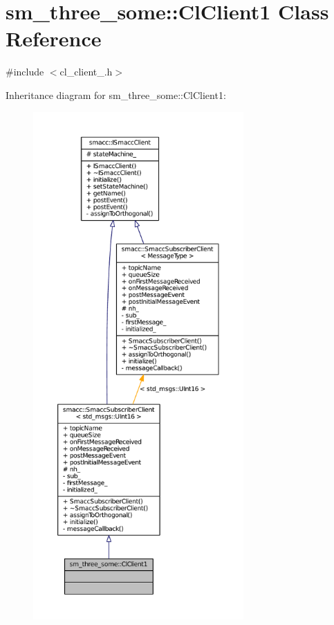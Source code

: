 \hypertarget{classsm__three__some_1_1ClClient1}{}\section{sm\+\_\+three\+\_\+some\+:\+:Cl\+Client1 Class Reference}
\label{classsm__three__some_1_1ClClient1}


{\ttfamily \#include $<$cl\+\_\+client\+\_.\+h$>$}



Inheritance diagram for sm\+\_\+three\+\_\+some\+:\+:Cl\+Client1\+:
\nopagebreak
\begin{figure}[H]
\begin{center}
\leavevmode
\includegraphics[height=550pt]{classsm__three__some_1_1ClClient1__inherit__graph}
\end{center}
\end{figure}


